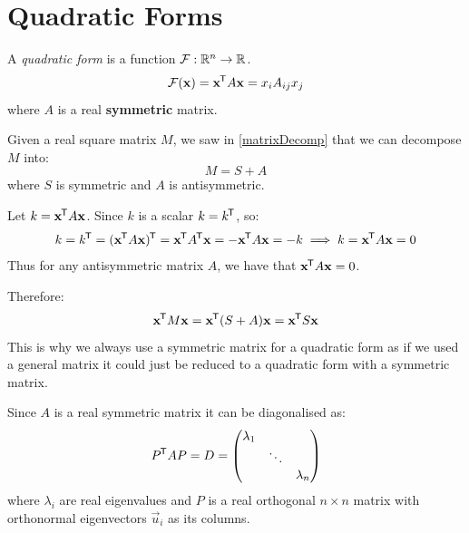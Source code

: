 \documentclass[../main.tex]{subfiles}
\begin{document}
\section{Quadratic Forms}
\begin{definition}
  A \textit{quadratic form} is a function $\mathcal{F}: \mathbb{R}^{n} \to \mathbb{R}$.
  \[
    \mathcal{F}(\mathbf{\bm{x}}) = \mathbf{\bm{x}}^{{\mkern-1.5mu\mathsf{T}}}A\mathbf{\bm{x}} = x_i A_{i j} x_j
  \]
  where $A$ is a real \textbf{symmetric} matrix.
\end{definition}
\begin{remark}
  Given a real square matrix $M$, we saw in \cref{matrixDecomp} that we can decompose $M$ into:
  \[
    M = S + A
  \]
  where $S$ is symmetric and $A$ is antisymmetric.

  Let $k = \mathbf{\bm{x}}^{{\mkern-1.5mu\mathsf{T}}}A\mathbf{\bm{x}}$.
  Since $k$ is a scalar $k = k^{{\mkern-1.5mu\mathsf{T}}}$, so:
  \[
   k = k^{{\mkern-1.5mu\mathsf{T}}} = (\mathbf{\bm{x}}^{{\mkern-1.5mu\mathsf{T}}} A \mathbf{\bm{x}})^{{\mkern-1.5mu\mathsf{T}}} = \mathbf{\bm{x}}^{{\mkern-1.5mu\mathsf{T}}} A^{{\mkern-1.5mu\mathsf{T}}} \mathbf{\bm{x}} = - \mathbf{\bm{x}}^{{\mkern-1.5mu\mathsf{T}}} A \mathbf{\bm{x}} = -k \implies k = \mathbf{\bm{x}}^{{\mkern-1.5mu\mathsf{T}}} A \mathbf{\bm{x}} = 0
  \]
  Thus for any antisymmetric matrix $A$, we have that $\mathbf{\bm{x}}^{{\mkern-1.5mu\mathsf{T}}}A\mathbf{\bm{x}} = 0$.

  Therefore:
  \[
    \mathbf{\bm{x}}^{{\mkern-1.5mu\mathsf{T}}} M \mathbf{\bm{x}} = \mathbf{\bm{x}}^{{\mkern-1.5mu\mathsf{T}}}(S + A)\mathbf{\bm{x}} = \mathbf{\bm{x}}^{{\mkern-1.5mu\mathsf{T}}}S\mathbf{\bm{x}}
  \]
  This is why we always use a symmetric matrix for a quadratic form as if we used a general matrix it could just be reduced to a quadratic form with a symmetric matrix.
\end{remark}
Since $A$ is a real symmetric matrix it can be diagonalised as:
\[
  P^{{\mkern-1.5mu\mathsf{T}}} A P = D = \begin{pmatrix}
  \lambda_1 &  &  \\
   & \ddots &  \\
   &  & \lambda_n \\
  \end{pmatrix}
\]
where $\lambda_i$ are real eigenvalues and $P$ is a real orthogonal $n \times n$ matrix with orthonormal eigenvectors $\vec{u}_i$ as its columns.
\end{document}
